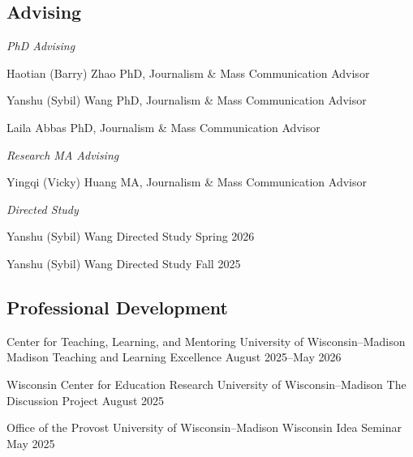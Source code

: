 \subsection{Advising}

\textit{PhD Advising}\par\vspace{0.2em}

\cvadvisee
  {Haotian (Barry) Zhao}
  {PhD, Journalism \& Mass Communication}
  {Advisor}
  {}
  {}

\cvadvisee
  {Yanshu (Sybil) Wang}
  {PhD, Journalism \& Mass Communication}
  {Advisor}
  {}
  {}

\cvadvisee
  {Laila Abbas}
  {PhD, Journalism \& Mass Communication}
  {Advisor}
  {}
  {}

\vspace{0.3em}
\textit{Research MA Advising}\par\vspace{0.2em}

\cvadvisee
  {Yingqi (Vicky) Huang}
  {MA, Journalism \& Mass Communication}
  {Advisor}
  {}
  {}

\vspace{0.3em}
\textit{Directed Study}\par\vspace{0.2em}

\cvadvisee
  {Yanshu (Sybil) Wang}
  {Directed Study}
  {}
  {}
  {Spring 2026}

\cvadvisee
  {Yanshu (Sybil) Wang}
  {Directed Study}
  {}
  {}
  {Fall 2025}

\subsection{Professional Development}

\cvservice
  {Center for Teaching, Learning, and Mentoring \textperiodcentered{} University of Wisconsin--Madison}
  {Madison Teaching and Learning Excellence}
  {}
  {August 2025--May 2026}

\cvservice
  {Wisconsin Center for Education Research \textperiodcentered{} University of Wisconsin--Madison}
  {The Discussion Project}
  {}
  {August 2025}

\cvservice
  {Office of the Provost \textperiodcentered{} University of Wisconsin--Madison}
  {Wisconsin Idea Seminar}
  {}
  {May 2025}
